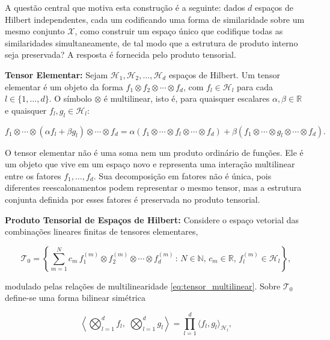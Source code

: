 A questão central que motiva esta construção é a seguinte: dados $d$ espaços de Hilbert independentes, cada um codificando uma forma de similaridade sobre um mesmo conjunto $\mathcal{X}$, como construir um espaço único que codifique todas as similaridades simultaneamente, de tal modo que a estrutura de produto interno seja preservada? A resposta é fornecida pelo produto tensorial.

\textbf{Tensor Elementar:} Sejam $\mathcal{H}_1, \mathcal{H}_2, \dots, \mathcal{H}_d$ espaços de Hilbert. Um tensor elementar é um objeto da forma $f_1 \otimes f_2 \otimes \cdots \otimes f_d$, com $f_l \in \mathcal{H}_l$ para cada $l \in \{1, \dots, d\}$. O símbolo $\otimes$ é multilinear, isto é, para quaisquer escalares $\alpha, \beta \in \mathbb{R}$ e quaisquer $f_l, g_l \in \mathcal{H}_l$:

\begin{equation}\label{eq:tensor_multilinear}
    f_1 \otimes \cdots \otimes (\alpha f_l + \beta g_l) \otimes \cdots \otimes f_d = \alpha (f_1 \otimes \cdots \otimes f_l \otimes \cdots \otimes f_d) + \beta (f_1 \otimes \cdots \otimes g_l \otimes \cdots \otimes f_d).
\end{equation}

O tensor elementar não é uma soma nem um produto ordinário de funções. Ele é um objeto que vive em um espaço novo e representa uma interação multilinear entre os fatores $f_1, \dots, f_d$. Sua decomposição em fatores não é única, pois diferentes reescalonamentos podem representar o mesmo tensor, mas a estrutura conjunta definida por esses fatores é preservada no produto tensorial.

\textbf{Produto Tensorial de Espaços de Hilbert:} Considere o espaço vetorial das combinações lineares finitas de tensores elementares,

\begin{equation}\label{eq:tensor_space}
    \mathcal{T}_0 = \left\{ \sum_{m=1}^{N} c_m \, f_1^{(m)} \otimes f_2^{(m)} \otimes \cdots \otimes f_d^{(m)} \, : \, N \in \mathbb{N}, \, c_m \in \mathbb{R}, \, f_l^{(m)} \in \mathcal{H}_l \right\},
\end{equation}

\noindent modulado pelas relações de multilinearidade \eqref{eq:tensor_multilinear}. Sobre $\mathcal{T}_0$ define-se uma forma bilinear simétrica

\begin{equation}\label{eq:tensor_inner}
    \left\langle \bigotimes_{l=1}^{d} f_l, \; \bigotimes_{l=1}^{d} g_l \right\rangle = \prod_{l=1}^{d} \langle f_l, g_l \rangle_{\mathcal{H}_l},
\end{equation}


